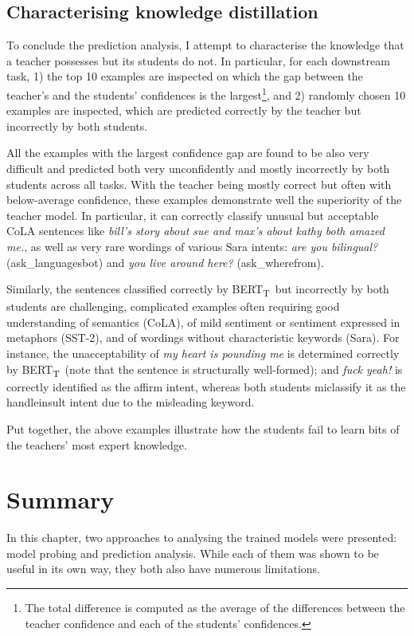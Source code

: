 \documentclass[bsc,frontabs,twoside,singlespacing,parskip,deptreport]{infthesis}
\def\BERTT{BERT\textsubscript{T}}
\begin{document}
{{    \subsection{Characterising knowledge distillation}{
      To conclude the prediction analysis, I attempt to characterise the knowledge that a teacher possesses but its students do not.
      In particular, for each downstream task, 1) the top 10 examples are inspected on which the gap between the teacher's and the students' confidences is the largest\footnote{The total difference is computed as the average of the differences between the teacher confidence and each of the students' confidences.}, and 2) randomly chosen 10 examples are inspected, which are predicted correctly by the teacher but incorrectly by both students.

      All the examples with the largest confidence gap are found to be also very difficult and predicted both very unconfidently and mostly incorrectly by both students across all tasks.
      With the teacher being mostly correct but often with below-average confidence, these examples demonstrate well the superiority of the teacher model. In particular, it can correctly classify unusual but acceptable CoLA sentences like \textit{bill's story about sue and max's about kathy both amazed me.}, as well as very rare wordings of various Sara intents: \textit{are you bilingual?} (ask\_languagesbot) and \textit{you live around here?} (ask\_wherefrom).

      Similarly, the sentences classified correctly by \BERTT~but incorrectly by both students are challenging, complicated examples often requiring good understanding of semantics (CoLA), of mild sentiment or sentiment expressed in metaphors (SST-2), and of wordings without characteristic keywords (Sara).
      For instance, the unacceptability of \textit{my heart is pounding me} is determined correctly by \BERTT~(note that the sentence is structurally well-formed); and \textit{fuck yeah!} is correctly identified as the affirm intent, whereas both students miclassify it as the handleinsult intent due to the misleading keyword.

      Put together, the above examples illustrate how the students fail to learn bits of the teachers' most expert knowledge.
    }
  }

  \section{Summary}{
    In this chapter, two approaches to analysing the trained models were presented: model probing and prediction analysis.
    While each of them was shown to be useful in its own way, they both also have numerous limitations.

}}
\end{document}
